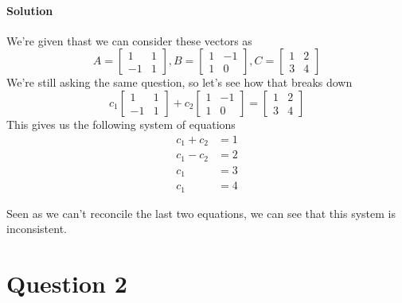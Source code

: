 \documentclass{article}
\begin{document}
        \paragraph{Solution}
           We're given thast we can consider these vectors as
            \[
                A = \begin{bmatrix}1 & 1\\-1 & 1\end{bmatrix},
                B = \begin{bmatrix}1 & -1\\1 & 0\end{bmatrix},
                C = \begin{bmatrix}1 & 2\\3 & 4\end{bmatrix}
            \]
            We're still asking the same question,
            so let's see how that breaks down
            \[
                c_1\begin{bmatrix}1 & 1\\-1 & 1\end{bmatrix} +
                c_2\begin{bmatrix}1 & -1\\1 & 0\end{bmatrix} =
                \begin{bmatrix}1 & 2\\3 & 4\end{bmatrix}
            \]
            This gives us the following system of equations
            \begin{align*}
                c_1 + c_2 &= 1\\
                c_1 - c_2 &= 2\\
                c_1 &= 3\\
                c_1 &= 4
            \end{align*}

            Seen as we can't reconcile the last two equations,
            we can see that this system is inconsistent.
    \section{Question 2}
\end{document}
